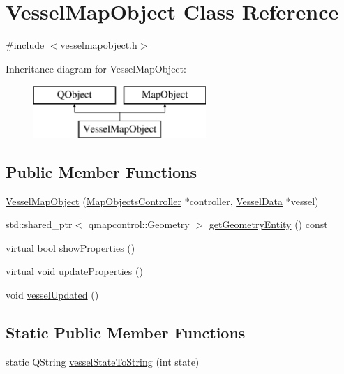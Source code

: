 \hypertarget{class_vessel_map_object}{}\section{Vessel\+Map\+Object Class Reference}
\label{class_vessel_map_object}


{\ttfamily \#include $<$vesselmapobject.\+h$>$}

Inheritance diagram for Vessel\+Map\+Object\+:\begin{figure}[H]
\begin{center}
\leavevmode
\includegraphics[height=2.000000cm]{d1/d74/class_vessel_map_object}
\end{center}
\end{figure}
\subsection*{Public Member Functions}
\begin{DoxyCompactItemize}
\item 
\mbox{\hyperlink{class_vessel_map_object_a072c9cbe34ac79c037995511d18fcc3d}{Vessel\+Map\+Object}} (\mbox{\hyperlink{class_map_objects_controller}{Map\+Objects\+Controller}} $\ast$controller, \mbox{\hyperlink{class_vessel_data}{Vessel\+Data}} $\ast$vessel)
\item 
std\+::shared\+\_\+ptr$<$ qmapcontrol\+::\+Geometry $>$ \mbox{\hyperlink{class_vessel_map_object_a7f982641edc34a85fd3fbfc81c7c9a68}{get\+Geometry\+Entity}} () const
\item 
virtual bool \mbox{\hyperlink{class_vessel_map_object_adb4af9fdb30c1e7501bba6f74dfd42c0}{show\+Properties}} ()
\item 
virtual void \mbox{\hyperlink{class_vessel_map_object_aba8d2fa5bdf2bbf13ade0fe2e7ba6b32}{update\+Properties}} ()
\item 
void \mbox{\hyperlink{class_vessel_map_object_a9c8d4f792897b7e7f8bbbd2b7091e958}{vessel\+Updated}} ()
\end{DoxyCompactItemize}
\subsection*{Static Public Member Functions}
\begin{DoxyCompactItemize}
\item 
static Q\+String \mbox{\hyperlink{class_vessel_map_object_ae838a6254c7ab941c6a0f373a801ad49}{vessel\+State\+To\+String}} (int state)
\end{DoxyCompactItemize}


